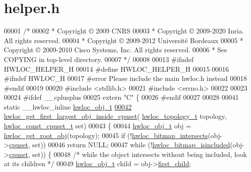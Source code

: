\hypertarget{a00122_source}{}\section{helper.\+h}
\label{a00122_source}

\begin{DoxyCode}
00001 \textcolor{comment}{/*}
00002 \textcolor{comment}{ * Copyright © 2009 CNRS}
00003 \textcolor{comment}{ * Copyright © 2009-2020 Inria.  All rights reserved.}
00004 \textcolor{comment}{ * Copyright © 2009-2012 Université Bordeaux}
00005 \textcolor{comment}{ * Copyright © 2009-2010 Cisco Systems, Inc.  All rights reserved.}
00006 \textcolor{comment}{ * See COPYING in top-level directory.}
00007 \textcolor{comment}{ */}
00008 
00013 \textcolor{preprocessor}{#ifndef HWLOC\_HELPER\_H}
00014 \textcolor{preprocessor}{#define HWLOC\_HELPER\_H}
00015 
00016 \textcolor{preprocessor}{#ifndef HWLOC\_H}
00017 \textcolor{preprocessor}{#error Please include the main hwloc.h instead}
00018 \textcolor{preprocessor}{#endif}
00019 
00020 \textcolor{preprocessor}{#include <stdlib.h>}
00021 \textcolor{preprocessor}{#include <errno.h>}
00022 
00023 
00024 \textcolor{preprocessor}{#ifdef \_\_cplusplus}
00025 \textcolor{keyword}{extern} \textcolor{stringliteral}{"C"} \{
00026 \textcolor{preprocessor}{#endif}
00027 
00028 
00041 \textcolor{keyword}{static} \_\_hwloc\_inline \hyperlink{a00238}{hwloc\_obj\_t}
\hyperlink{a00195_ga547325a4193dbc215d07c23097519d79}{00042} \hyperlink{a00195_ga547325a4193dbc215d07c23097519d79}{hwloc\_get\_first\_largest\_obj\_inside\_cpuset}(
      \hyperlink{a00186_ga9d1e76ee15a7dee158b786c30b6a6e38}{hwloc\_topology\_t} topology, \hyperlink{a00183_ga1f784433e9b606261f62d1134f6a3b25}{hwloc\_const\_cpuset\_t} \textcolor{keyword}{set})
00043 \{
00044   \hyperlink{a00238}{hwloc\_obj\_t} obj = \hyperlink{a00187_ga2d4b12fc187dfc53b35f2fa21d21044d}{hwloc\_get\_root\_obj}(topology);
00045   \textcolor{keywordflow}{if} (!\hyperlink{a00205_gaefa070f9232857ba5a57297ea9a08ea2}{hwloc\_bitmap\_intersects}(obj->\hyperlink{a00238_a67925e0f2c47f50408fbdb9bddd0790f}{cpuset}, \textcolor{keyword}{set}))
00046     \textcolor{keywordflow}{return} NULL;
00047   \textcolor{keywordflow}{while} (!\hyperlink{a00205_ga0526e03db81956fb02acc8260b66d6a4}{hwloc\_bitmap\_isincluded}(obj->\hyperlink{a00238_a67925e0f2c47f50408fbdb9bddd0790f}{cpuset}, \textcolor{keyword}{set})) \{
00048     \textcolor{comment}{/* while the object intersects without being included, look at its children */}
00049     \hyperlink{a00238}{hwloc\_obj\_t} child = obj->\hyperlink{a00238_af51d08a0a79dba517c06c5afedc8d2dc}{first\_child};

\end{DoxyCode}
